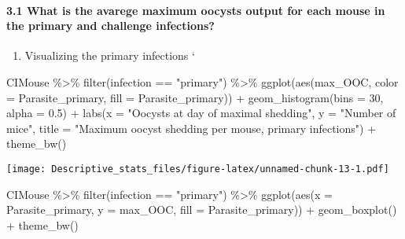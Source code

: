 \documentclass[
]{article}
\newenvironment{Shaded}{\begin{snugshade}}{\end{snugshade}}
\newcommand{\AttributeTok}[1]{\textcolor[rgb]{0.77,0.63,0.00}{#1}}
\newcommand{\DecValTok}[1]{\textcolor[rgb]{0.00,0.00,0.81}{#1}}
\newcommand{\FloatTok}[1]{\textcolor[rgb]{0.00,0.00,0.81}{#1}}
\newcommand{\FunctionTok}[1]{\textcolor[rgb]{0.00,0.00,0.00}{#1}}
\newcommand{\NormalTok}[1]{#1}
\newcommand{\SpecialCharTok}[1]{\textcolor[rgb]{0.00,0.00,0.00}{#1}}
\newcommand{\StringTok}[1]{\textcolor[rgb]{0.31,0.60,0.02}{#1}}
\providecommand{\tightlist}{%
  \setlength{\itemsep}{0pt}\setlength{\parskip}{0pt}}
\begin{document}
\hypertarget{what-is-the-avarege-maximum-oocysts-output-for-each-mouse-in-the-primary-and-challenge-infections}{%
\paragraph{3.1 What is the avarege maximum oocysts output for each mouse
in the primary and challenge
infections?}\label{what-is-the-avarege-maximum-oocysts-output-for-each-mouse-in-the-primary-and-challenge-infections}}

\begin{enumerate}
\def\labelenumi{\arabic{enumi}.}
\tightlist
\item
  Visualizing the primary infections `
\end{enumerate}

\begin{Shaded}
\begin{Highlighting}[]
\NormalTok{CIMouse }\SpecialCharTok{\%\textgreater{}\%}
    \FunctionTok{filter}\NormalTok{(infection }\SpecialCharTok{==} \StringTok{"primary"}\NormalTok{)  }\SpecialCharTok{\%\textgreater{}\%}
  \FunctionTok{ggplot}\NormalTok{(}\FunctionTok{aes}\NormalTok{(max\_OOC, }\AttributeTok{color =}\NormalTok{ Parasite\_primary, }\AttributeTok{fill =}\NormalTok{ Parasite\_primary)) }\SpecialCharTok{+}
  \FunctionTok{geom\_histogram}\NormalTok{(}\AttributeTok{bins =} \DecValTok{30}\NormalTok{, }\AttributeTok{alpha =} \FloatTok{0.5}\NormalTok{) }\SpecialCharTok{+}
  \FunctionTok{labs}\NormalTok{(}\AttributeTok{x =} \StringTok{"Oocysts at day of maximal shedding"}\NormalTok{, }\AttributeTok{y =} \StringTok{"Number of mice"}\NormalTok{,}
       \AttributeTok{title =} \StringTok{"Maximum oocyst shedding per mouse, primary infections"}\NormalTok{) }\SpecialCharTok{+}
    \FunctionTok{theme\_bw}\NormalTok{()}
\end{Highlighting}
\end{Shaded}

\texttt{[image: Descriptive\_stats\_files/figure-latex/unnamed-chunk-13-1.pdf]}

\begin{Shaded}
\begin{Highlighting}[]
\NormalTok{CIMouse  }\SpecialCharTok{\%\textgreater{}\%}
    \FunctionTok{filter}\NormalTok{(infection }\SpecialCharTok{==} \StringTok{"primary"}\NormalTok{)  }\SpecialCharTok{\%\textgreater{}\%}
  \FunctionTok{ggplot}\NormalTok{(}\FunctionTok{aes}\NormalTok{(}\AttributeTok{x =}\NormalTok{ Parasite\_primary, }\AttributeTok{y =}\NormalTok{ max\_OOC, }\AttributeTok{fill =}\NormalTok{ Parasite\_primary)) }\SpecialCharTok{+}
  \FunctionTok{geom\_boxplot}\NormalTok{() }\SpecialCharTok{+}
    \FunctionTok{theme\_bw}\NormalTok{()}
\end{Highlighting}
\end{Shaded}
\end{document}
